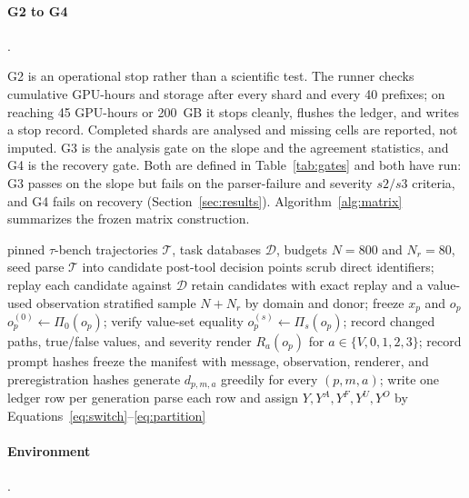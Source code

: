 \documentclass[a4paper,fleqn]{cas-sc}
\begin{document}
\paragraph{G2 to G4}.\

G2 is an operational stop rather than a scientific test. The runner checks cumulative GPU-hours
and storage after every shard and every 40 prefixes; on reaching 45 GPU-hours or 200~GB it stops
cleanly, flushes the ledger, and writes a stop record. Completed shards are analysed and missing
cells are reported, not imputed. G3 is the analysis gate on the slope and the agreement
statistics, and G4 is the recovery gate. Both are defined in Table~\ref{tab:gates} and both have
run: G3 passes on the slope but fails on the parser-failure and severity $s2/s3$ criteria, and G4
fails on recovery (Section~\ref{sec:results}). Algorithm~\ref{alg:matrix} summarizes the frozen
matrix construction.

\begin{algorithm}[htbp]
  \caption{Frozen fixed-prefix matrix and labels (G0--G2).}
  \label{alg:matrix}
  \begin{algorithmic}[1]
    \Require pinned $\tau$-bench trajectories $\mathcal{T}$, task databases $\mathcal{D}$,
    budgets $N=800$ and $N_{r}=80$, seed
    \State parse $\mathcal{T}$ into candidate post-tool decision points
    \State scrub direct identifiers; replay each candidate against $\mathcal{D}$
    \State retain candidates with exact replay and a value-used observation
    \State stratified sample $N+N_{r}$ by domain and donor; freeze $x_p$ and $o_p$
      \State $o_p^{(0)}\gets\Pi_0(o_p)$; verify value-set equality
        \State $o_p^{(s)}\gets\Pi_s(o_p)$; record changed paths, true/false values, and severity
      \EndFor
      \State render $R_a(o_p)$ for $a\in\{V,0,1,2,3\}$; record prompt hashes
    \EndFor
    \State freeze the manifest with message, observation, renderer, and preregistration hashes
    \State generate $d_{p,m,a}$ greedily for every $(p,m,a)$; write one ledger row per generation
    \State parse each row and assign $Y,Y^{A},Y^{F},Y^{U},Y^{O}$ by
    Equations~\ref{eq:switch}--\ref{eq:partition}
  \end{algorithmic}
\end{algorithm}


\paragraph{Environment}.\
\end{document}
